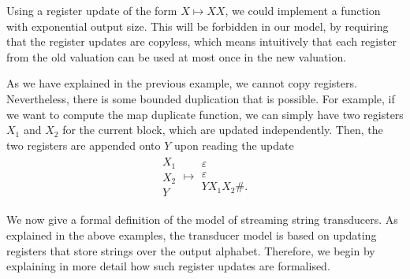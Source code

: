 \begin{myexample}
    Using a register update of the form $X \mapsto XX$, we could implement a function with exponential output size. This will be forbidden in our model, by requiring that the register updates are copyless, which means intuitively that each register from the old valuation can be used at most once in the new valuation. 
\end{myexample}

\begin{myexample}
    \label{ex:map-duplicate-function-sst}
    As we have explained in the previous example, we cannot copy registers. Nevertheless, there is some bounded duplication that is possible. For example, if we want to compute the map duplicate function, we can simply have two registers $X_1$ and $X_2$ for the current block, which are updated independently. Then, the two registers are appended onto $Y$ upon reading the update
\begin{align*}
    \begin{smallmatrix}        X_1 \\
        X_2 \\ 
        Y
    \end{smallmatrix}        \mapsto 
    \begin{smallmatrix}        \varepsilon \\ 
        \varepsilon \\
        {YX_1X_2\#}.
    \end{smallmatrix}
\end{align*}
\end{myexample}

We now give a formal definition of the model of streaming string transducers. As explained in the above examples, the transducer model is based on updating registers that store strings over the output alphabet. Therefore, we begin by explaining in more detail how such register updates are formalised.

